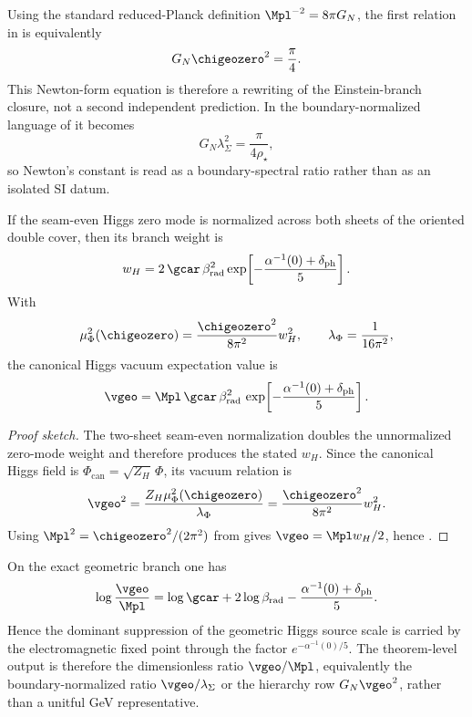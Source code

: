 \begin{remark}
Using the standard reduced-Planck definition $\Mpl^{-2}=8\pi G_N$, the first relation in  is equivalently
\[
G_N\chigeozero^2=\frac{\pi}{4}.
\]
This Newton-form equation is therefore a rewriting of the Einstein-branch closure, not a second
independent prediction. In the boundary-normalized language of
 it becomes
\[
G_N\lambda_\Sigma^2=\frac{\pi}{4\rho_\star},
\]
so Newton's constant is read as a boundary-spectral ratio rather than as an isolated SI datum.
\end{remark}

\begin{lemma}
\label{lem:two-sheet-zero-mode-normalization}
If the seam-even Higgs zero mode is normalized across both sheets of the oriented double cover, then its branch weight is
\[
w_H
=
2\,\gcar\,\beta_{\mathrm{rad}}^2
\exp\!\left[-\frac{\alpha^{-1}(0)+\delta_{\mathrm{ph}}}{5}\right].
\]
With
\[
\mu_\Phi^2(\chigeozero)=\frac{\chigeozero^2}{8\pi^2}w_H^2,
\qquad
\lambda_\Phi=\frac{1}{16\pi^2},
\]
the canonical Higgs vacuum expectation value is
\begin{equation}
\label{eq:carrier-dressed-v}
\vgeo
=
\Mpl\,\gcar\,\beta_{\mathrm{rad}}^2\,
\exp\!\left[-\frac{\alpha^{-1}(0)+\delta_{\mathrm{ph}}}{5}\right].
\end{equation}
\end{lemma}

\begin{proof}[Proof sketch]
The two-sheet seam-even normalization doubles the unnormalized zero-mode weight and therefore produces the stated $w_H$. Since the canonical Higgs field is $\Phi_{\mathrm{can}}=\sqrt{Z_H}\,\Phi$, its vacuum relation is
\[
\vgeo^2=\frac{Z_H\mu_\Phi^2(\chigeozero)}{\lambda_\Phi}
=
\frac{\chigeozero^2}{8\pi^2}w_H^2.
\]
Using $\Mpl^2=\chigeozero^2/(2\pi^2)$ from  gives $\vgeo=\Mpl w_H/2$, hence .
\end{proof}

\begin{corollary}
\label{cor:hierarchy-compression-vgeo}
On the exact geometric branch one has
\[
\log\frac{\vgeo}{\Mpl}
=
\log\gcar
+
2\log\beta_{\mathrm{rad}}
-
\frac{\alpha^{-1}(0)+\delta_{\mathrm{ph}}}{5}.
\]
Hence the dominant suppression of the geometric Higgs source scale is carried by the electromagnetic
fixed point through the factor $e^{-\alpha^{-1}(0)/5}$. The theorem-level output is therefore the
dimensionless ratio $\vgeo/\Mpl$, equivalently the boundary-normalized ratio $\vgeo/\lambda_\Sigma$
or the hierarchy row $G_N\vgeo^2$, rather than a unitful GeV representative.
\end{corollary}

